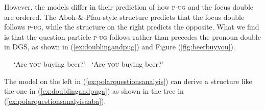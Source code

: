 However, the models differ in their prediction of how \textsc{p-ug} and the focus double are ordered. The Aboh-\&-Pfau-style structure predicts that the focus double follows \textsc{p-ug}, while the structure on the right predicts the opposite. What we find is that the question particle \textsc{p-ug} follows rather than precedes the pronoun double in DGS, as shown in (\ref{ex:doublingandpug}) and Figure (\ref{fig:beerbuyyou}).

\begin{exe}
\ex\label{ex:doublingandpug}\begin{xlist}
\ex \textcolor{white}{*}
\glt \textcolor{white}{*}`Are \textsc{you} buying beer?' \label{ex:doublingandpuga}
\ex *
\glt \textcolor{white}{*}`Are \textsc{you} buying beer?' \label{ex:doublingandpugb}
\end{xlist}
\end{exe}

\noindent The model on the left in (\ref{ex:polarquestionsanalyis}) can derive a structure like the one in (\ref{ex:doublingandpuga}) as shown in the tree in (\ref{ex:polarquestionsanalyisaaba}).



\begin{exe}
\ex \label{ex:polarquestionsanalyisaaba}

\end{exe}


